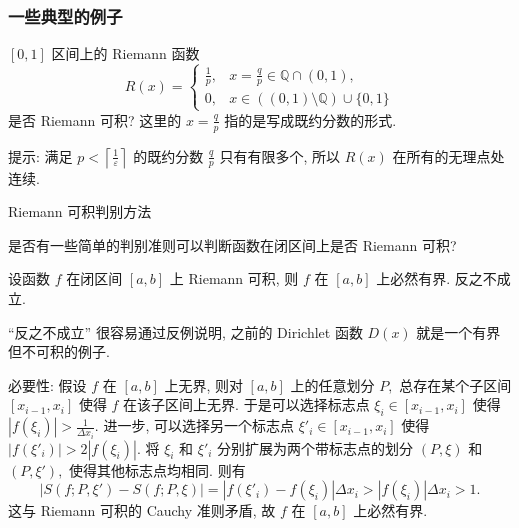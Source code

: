 
\begin{frame}
\frametitle{一些典型的例子}

\begin{question}
$[0, 1]$ 区间上的 Riemann 函数
\[
R(x) = \begin{cases}
\frac{1}{p}, & x = \frac{q}{p} \in \mathbb{Q} \cap (0, 1),\\
0, & x \in ((0, 1) \setminus \mathbb{Q}) \cup \{0, 1\}
\end{cases}
\]
是否 Riemann 可积? 这里的 $x = \frac{q}{p}$ 指的是写成既约分数的形式.
\end{question}

\pause
\vspace{1em}

提示: 满足 $p < \left\lceil \frac{1}{\varepsilon} \right\rceil$ 的既约分数 $\frac{q}{p}$ 只有有限多个, 所以 $R(x)$ 在所有的无理点处连续.

\end{frame}


\begin{frame}{Riemann 可积判别方法}

{
\larger[1]
\begin{center}
\color{red}
是否有一些简单的判别准则可以判断函数在闭区间上是否 Riemann 可积?
\end{center}
}

\pause

\begin{prop}
设函数 $f$ 在闭区间 $[a,b]$ 上 Riemann 可积, 则 $f$ 在 $[a,b]$ 上必然有界. 反之不成立.
\end{prop}

\vspace{0.5em}
\pause

{\color{red}} ``反之不成立'' 很容易通过反例说明, 之前的 Dirichlet 函数 $D(x)$ 就是一个有界但不可积的例子.

\vspace{0.5em}

{\color{red}} 必要性: 假设 $f$ 在 $[a,b]$ 上无界, 则对 $[a, b]$ 上的任意划分 $P,$ 总存在某个子区间 $[x_{i-1}, x_i]$ 使得 $f$ 在该子区间上无界. 于是可以选择标志点 $\xi_i \in [x_{i-1}, x_i]$ 使得 $|f(\xi_i)| > \frac{1}{\Delta x_i}.$ 进一步, 可以选择另一个标志点 $\xi'_i \in [x_{i-1}, x_i]$ 使得 $|f(\xi'_i)| > 2 |f(\xi_i)|.$ 将 $\xi_i$ 和 $\xi'_i$ 分别扩展为两个带标志点的划分 $(P, \xi)$ 和 $(P, \xi'),$ 使得其他标志点均相同. 则有
\[
|S(f; P, \xi') - S(f; P, \xi)| = |f(\xi'_i) - f(\xi_i)| \Delta x_i > |f(\xi_i)| \Delta x_i > 1.
\]
这与 Riemann 可积的 Cauchy 准则矛盾, 故 $f$ 在 $[a,b]$ 上必然有界.

\end{frame}

